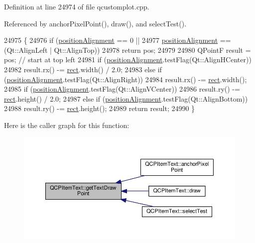 Definition at line 24974 of file qcustomplot.\+cpp.



Referenced by anchor\+Pixel\+Point(), draw(), and select\+Test().


\begin{DoxyCode}
24975                                                                            \{
24976   \textcolor{keywordflow}{if} (\hyperlink{class_q_c_p_item_text_af13c6adc480f268116ae72196eb44b06}{positionAlignment} == 0 ||
24977       \hyperlink{class_q_c_p_item_text_af13c6adc480f268116ae72196eb44b06}{positionAlignment} == (Qt::AlignLeft | Qt::AlignTop))
24978     \textcolor{keywordflow}{return} pos;
24979 
24980   QPointF result = pos; \textcolor{comment}{// start at top left}
24981   \textcolor{keywordflow}{if} (\hyperlink{class_q_c_p_item_text_af13c6adc480f268116ae72196eb44b06}{positionAlignment}.testFlag(Qt::AlignHCenter))
24982     result.rx() -= \hyperlink{_gen_blob_8m_aea8f6815d9a63491fc422c5572c6b3c3}{rect}.width() / 2.0;
24983   \textcolor{keywordflow}{else} \textcolor{keywordflow}{if} (\hyperlink{class_q_c_p_item_text_af13c6adc480f268116ae72196eb44b06}{positionAlignment}.testFlag(Qt::AlignRight))
24984     result.rx() -= \hyperlink{_gen_blob_8m_aea8f6815d9a63491fc422c5572c6b3c3}{rect}.width();
24985   \textcolor{keywordflow}{if} (\hyperlink{class_q_c_p_item_text_af13c6adc480f268116ae72196eb44b06}{positionAlignment}.testFlag(Qt::AlignVCenter))
24986     result.ry() -= \hyperlink{_gen_blob_8m_aea8f6815d9a63491fc422c5572c6b3c3}{rect}.height() / 2.0;
24987   \textcolor{keywordflow}{else} \textcolor{keywordflow}{if} (\hyperlink{class_q_c_p_item_text_af13c6adc480f268116ae72196eb44b06}{positionAlignment}.testFlag(Qt::AlignBottom))
24988     result.ry() -= \hyperlink{_gen_blob_8m_aea8f6815d9a63491fc422c5572c6b3c3}{rect}.height();
24989   \textcolor{keywordflow}{return} result;
24990 \}
\end{DoxyCode}


Here is the caller graph for this function\+:\nopagebreak
\begin{figure}[H]
\begin{center}
\leavevmode
\includegraphics[width=350pt]{class_q_c_p_item_text_aa6e478b1ce198eace89157c4cacc3ddc_icgraph}
\end{center}
\end{figure}


